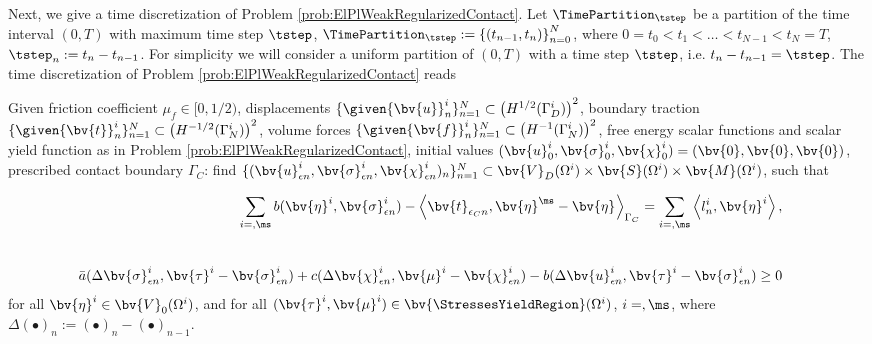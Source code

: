 Next, we give a time discretization of Problem \ref{prob:ElPlWeakRegularizedContact}. Let $\TimePartition_{\tstep}$ be a partition of the time interval $(0,T)$ with maximum time step $\tstep$, $\TimePartition_{\tstep}:=\left\lbrace (t_{n-1},t_{n})  \right\rbrace_{n=0}^{N}$, where $0=t_{0}<t_1<\ldots<t_{N-1}<t_{N}=T$, $\tstep_{n}:=t_{n}-t_{n-1}$. For simplicity we will consider a uniform  partition of $(0,T)$ with a time step $\tstep$, i.e. $t_{n}-t_{n-1}=\tstep$. The time discretization of Problem \ref{prob:ElPlWeakRegularizedContact} reads
\begin{problem}\label{prob:ElPlWeakRegularizedContactTimeDiscretization}
Given  friction coefficient $\mu_f \in [0,1/2) $, displacements $\{\given{\bv{u}}^i_n\}_{n=1}^{N} \subset \left(H^{1/2}(\Gamma_D^i)\right)^2$, boundary traction 
$\{\given{\bv{t}}^i_n\}_{n=1}^{N}\subset \left(H^{-1/2}(\Gamma_N^i)\right)^2$, volume forces $\{\given{\bv{f}}^i_n\}_{n=1}^{N }\subset\left(H^{-1}(\Gamma_N^i)\right)^2$, free energy scalar functions and   scalar yield  function as in Problem \ref{prob:ElPlWeakRegularizedContact}, initial values $(\bv{u}^i_0,\bv{\sigma}^{i}_0,\bv{\chi}^{i}_0)=(\bv{0},\bv{0},\bv{0})$, prescribed contact boundary $\Gamma_C$: 
find $\{(\bv{u}^i_{\epsilon n},\bv{\sigma}^{i}_{\epsilon n},\bv{\chi}^i_{\epsilon n})_n\}_{n=1}^{N}\subset \bv{V}_D(\Omega^i)\times \bv{S}(\Omega^i)\times \bv{M}(\Omega^i)$, such that

\begin{eqnarray}
\sum \limits_{i=\sl,\ms}  b(\bv{\eta}^i,\bv{\sigma}^i_{\epsilon n})- \left\langle \bv{t}_{\epsilon_C n}, \bv{\eta}^{\ms}-\bv{\eta}^{\sl} \right\rangle_{\Gamma_C}    =\sum \limits_{i=\sl,\ms}\left\langle l_{n}^{i},\bv{\eta}^{i}\right\rangle, & &\label{eq:ElPlContWeakFormMechRegTimeDiscretization}\\[5ex]
 \bar{a}(\Delta \bv{\sigma}^i_{\epsilon n},\bv{\tau}^i-\bv{\sigma}^i_{\epsilon n})+c(\Delta \bv{\chi}^i_{\epsilon n},\bv{\mu}^i-\bv{\chi}^i_{\epsilon n})-b(\Delta \bv{u}^i_{\epsilon n},\bv{\tau}^i-\bv{\sigma}^i_{\epsilon n})\geq 0 &&\label{eq:ElPlContWeakFormPlastRegTimeDiscretization} 
\end{eqnarray}
for all $\bv{\eta}^i \in \bv{V}_0(\Omega^i) $, and for all $(\bv{\tau}^i,\bv{\mu}^i)\in \bv{\StressesYieldRegion}(\Omega^i)$, $i=\sl,\ms$, where $\Delta (\bullet)_{n}:= (\bullet)_{n}- (\bullet)_{n-1}$.
\end{problem}

